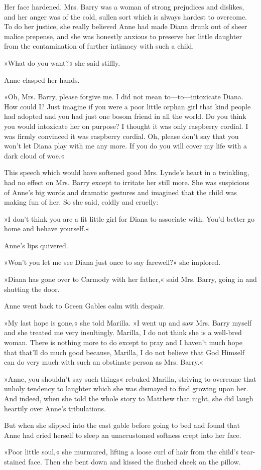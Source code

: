 Her face hardened. Mrs. Barry was a woman of strong prejudices and dislikes, and her anger was of the cold, sullen sort which is always hardest to overcome. To do her justice, she really believed Anne had made Diana drunk out of sheer malice prepense, and she was honestly anxious to preserve her little daughter from the contamination of further intimacy with such a child.

»What do you want?« she said stiffly.

Anne clasped her hands.

»Oh, Mrs. Barry, please forgive me. I did not mean to—to—intoxicate Diana. How could I? Just imagine if you were a poor little orphan girl that kind people had adopted and you had just one bosom friend in all the world. Do you think you would intoxicate her on purpose? I thought it was only raspberry cordial. I was firmly convinced it was raspberry cordial. Oh, please don’t say that you won’t let Diana play with me any more. If you do you will cover my life with a dark cloud of woe.«

This speech which would have softened good Mrs. Lynde’s heart in a twinkling, had no effect on Mrs. Barry except to irritate her still more. She was suspicious of Anne’s big words and dramatic gestures and imagined that the child was making fun of her. So she said, coldly and cruelly:

»I don’t think you are a fit little girl for Diana to associate with. You’d better go home and behave yourself.«

Anne’s lips quivered.

»Won’t you let me see Diana just once to say farewell?« she implored.

»Diana has gone over to Carmody with her father,« said Mrs. Barry, going in and shutting the door.

Anne went back to Green Gables calm with despair.

»My last hope is gone,« she told Marilla. »I went up and saw Mrs. Barry myself and she treated me very insultingly. Marilla, I do not think she is a well-bred woman. There is nothing more to do except to pray and I haven’t much hope that that’ll do much good because, Marilla, I do not believe that God Himself can do very much with such an obstinate person as Mrs. Barry.«

»Anne, you shouldn’t say such things« rebuked Marilla, striving to overcome that unholy tendency to laughter which she was dismayed to find growing upon her. And indeed, when she told the whole story to Matthew that night, she did laugh heartily over Anne’s tribulations.

But when she slipped into the east gable before going to bed and found that Anne had cried herself to sleep an unaccustomed softness crept into her face.

»Poor little soul,« she murmured, lifting a loose curl of hair from the child’s tear-stained face. Then she bent down and kissed the flushed cheek on the pillow.